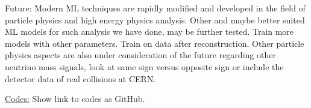 \documentclass[a4paper, american, 12pt]{report}
\begin{document}
	Future: Modern ML techniques are rapidly modified and developed in the field of particle physics and high energy physics analysis. Other and maybe better suited ML models for such analysis we have done, may be further tested. Train more models with other parameters. Train on data after reconstruction.
	Other particle physics aspects are also under consideration of the future regarding other neutrino mass signals, look at same sign versus opposite sign or include the detector data of real collisions at CERN.
	

	\underline{Codes:}
	Show link to codes as GitHub.	
\end{document}
